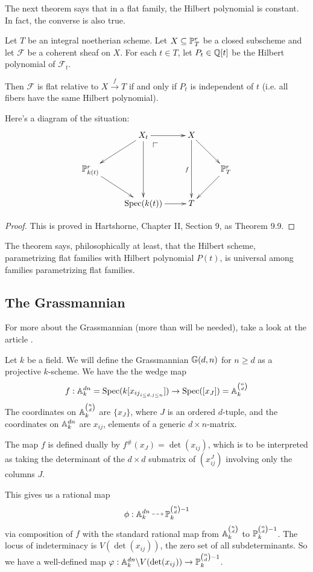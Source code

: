 \documentclass[11pt, english]{article}
\begin{document}
The next theorem says that in a flat family, the Hilbert polynomial is constant. In fact, the converse is also true. 
 
\begin{thm}
Let $T$ be an integral noetherian scheme. Let $X \subseteq \mathbb{P}_T^r$ be a closed subscheme and let $\mathcal F$ be a coherent sheaf on $X$. For each $t \in T$, let $P_t \in \mathbb{Q}[t]$ be the Hilbert polynomial of $\mathcal F_t$.

Then $\mathcal F$ is flat relative to $X \xrightarrow{f} T$ if and only if $P_t$ is independent of $t$ (i.e. all fibers have the same Hilbert polynomial).
\end{thm}
Here's a diagram of the situation:
\[
\xymatrix{
 &  \ar[dd] \ar[ld] \ar[r] X_t  \pullbackcorner & X \ar[dd]_f \ar[dr] & \\
\PP_{k(t)}^r  \ar[rd] && & \PP_T^r \ar[dl] \\
 & \Spec(k(t)) \ar[r] & T 
}
\]
\begin{proof}
This is proved in Hartshorne, Chapter II, Section 9, as Theorem 9.9. 
\end{proof}

The theorem says, philosophically at least, that the Hilbert scheme, parametrizing flat families with Hilbert polynomial $P(t)$, is universal among families parametrizing flat families.

\subsection{The Grassmannian}
\label{subsec:grassmannian}

For more about the Grassmannian (more than will be needed), take a look at the article \cite{kleiman_grassmannians}.  

Let $k$ be a field. We will define the Grassmannian $\mathbb{G}(d,n)$ for $n \geq d$ as a projective $k$-scheme. We have the the wedge map 
\[
f: \mathbb{A}_k^{dn} =  \operatorname{Spec} (k[x_{{ij}_{i \leq d, j \leq n}}]) \to \operatorname{Spec}([x_J]) = \mathbb{A}_k^{\binom nd}
\]
The coordinates on $\mathbb{A}_k^{\binom nd}$ are $\{x_J\}$, where $J$ is an ordered $d$-tuple, and the coordinates on $\mathbb{A}_k^{dn}$ are $x_{ij}$, elements of a generic $d \times n$-matrix.

The map $f$ is defined dually by $f^\#(x_J)=\det(x_{ij})$, which is to be interpreted as taking the determinant of the $d \times d$ submatrix of $(x_{ij}^J)$ involving only the columns $J$.

This gives us a rational map
\[
\phi: \Aa_k^{dn} \rmap \PP_k^{\binom nd - 1}
\]
via composition of $f$ with the standard rational map from $\mathbb{A}_k^{\binom nd}$ to $\mathbb{P}_k^{\binom nd - 1}$. The locus of indeterminacy is $V(\det(x_{ij}))$, the zero set of all subdeterminants. So we have a well-defined map $\varphi:\mathbb{A}_k^{dn} \backslash V(\det(x_{ij})) \to \mathbb{P}_k^{\binom nd - 1}$.
\end{document}

